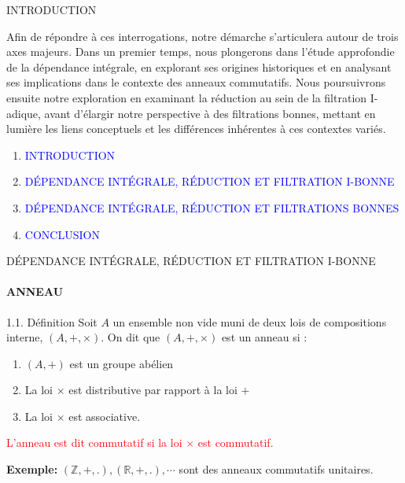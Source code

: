 \documentclass[11pt,a4paper]{beamer}
\begin{document}
\begin{frame}{INTRODUCTION}
	\begin{block}{}
		Afin de répondre à ces interrogations, notre démarche s'articulera autour de trois axes majeurs. Dans un premier temps, nous plongerons dans l'étude approfondie de la dépendance intégrale, en explorant ses origines historiques et en analysant ses implications dans le contexte des anneaux commutatifs. Nous poursuivrons ensuite notre exploration en examinant la réduction au sein de la filtration I-adique, avant d'élargir notre perspective à des filtrations bonnes, mettant en lumière les liens conceptuels et les différences inhérentes à ces contextes variés.
	\end{block}
\end{frame}


\begin{frame}
\begin{enumerate}
\item<0> \textcolor{blue}{INTRODUCTION}\\
\item<1> \textcolor{blue}{DÉPENDANCE INTÉGRALE, RÉDUCTION ET FILTRATION I-BONNE }\\
\item<0> \textcolor{blue}{DÉPENDANCE INTÉGRALE, RÉDUCTION ET FILTRATIONS BONNES }\\
\item<0> \textcolor{blue}{CONCLUSION}\\
\end{enumerate}
\end{frame}
\begin{frame}{DÉPENDANCE INTÉGRALE, RÉDUCTION ET FILTRATION I-BONNE}
	\framesubtitle{ANNEAU}
	\begin{block}{1.1. Définition}
			Soit $A$ un ensemble non vide muni de deux lois de compositions interne, $(A, +, \times)$. On dit que $(A, +, \times)$ est un anneau si :
		\begin{enumerate}
			\item[(i)] $(A,+)$ est un groupe abélien \pause
			\item[(ii)] La loi $\times$ est distributive par rapport à la loi $+$ \pause
			\item[(iii)] La loi $\times$ est associative.
		\end{enumerate}
		\textcolor{red}{L'anneau est dit commutatif si la loi $\times$ est commutatif.} \pause
	
		\textbf{Exemple:} $(\mathbb{Z}, +, .), (\mathbb{R}, +, .), \cdots$  sont des anneaux commutatifs unitaires.
	\end{block}
\end{frame}
\end{document}
